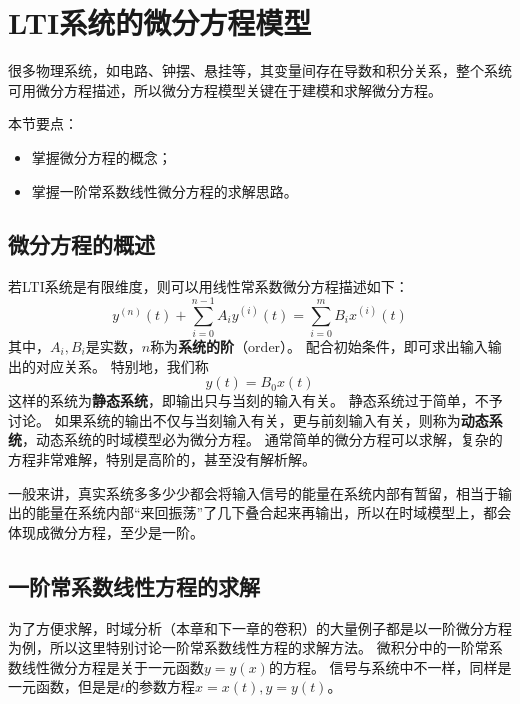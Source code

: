 \section{LTI系统的微分方程模型}

很多物理系统，如电路、钟摆、悬挂等，其变量间存在导数和积分关系，整个系统可用微分方程描述，所以微分方程模型关键在于建模和求解微分方程。

本节要点：
\begin{itemize}
    \item 掌握微分方程的概念；
    \item 掌握一阶常系数线性微分方程的求解思路。
\end{itemize}

\subsection{微分方程的概述}

若LTI系统是有限维度，则可以用线性常系数微分方程描述如下：
\[
y^{\left( n \right)}\left( t \right) +\sum_{i=0}^{n-1}{A_iy^{\left( i \right)}\left( t \right)}=\sum_{i=0}^m{B_ix^{\left( i \right)}\left( t \right)}
\]
其中，$A_i,B_i$是实数，$n$称为{\bf 系统的阶}（order）。
配合初始条件，即可求出输入输出的对应关系。
特别地，我们称
\[
y\left( t \right) =B_0x\left( t \right)
\]
这样的系统为{\bf 静态系统}，即输出只与当刻的输入有关。
静态系统过于简单，不予讨论。
如果系统的输出不仅与当刻输入有关，更与前刻输入有关，则称为{\bf 动态系统}，动态系统的时域模型必为微分方程。
通常简单的微分方程可以求解，复杂的方程非常难解，特别是高阶的，甚至没有解析解。

一般来讲，真实系统多多少少都会将输入信号的能量在系统内部有暂留，相当于输出的能量在系统内部“来回振荡”了几下叠合起来再输出，所以在时域模型上，都会体现成微分方程，至少是一阶。

\subsection{一阶常系数线性方程的求解}

\begin{tcolorbox}
为了方便求解，时域分析（本章和下一章的卷积）的大量例子都是以一阶微分方程为例，所以这里特别讨论一阶常系数线性方程的求解方法。
微积分中的一阶常系数线性微分方程是关于一元函数$y=y\left( x \right) $的方程。
信号与系统中不一样，同样是一元函数，但是是$t$的参数方程$x=x\left( t \right) ,y=y\left( t \right) $。
\end{tcolorbox}

